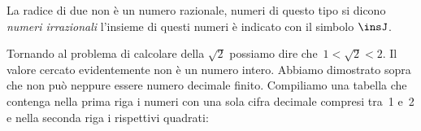 
% 
% 

La radice di due non è un numero razionale, numeri di questo tipo si dicono 
\emph{numeri irrazionali} l'insieme di questi numeri è indicato con il 
simbolo \(\insJ\).

Tornando al problema di calcolare della \(\sqrt{2}\) possiamo dire 
che~$1<\sqrt{2}<2$. 
Il valore cercato evidentemente non è un numero intero. 
Abbiamo dimostrato sopra che non può neppure essere
numero decimale finito.
Compiliamo una tabella che contenga nella prima
riga i numeri con una sola cifra decimale compresi tra~1 e~2 e nella
seconda riga i rispettivi quadrati:

